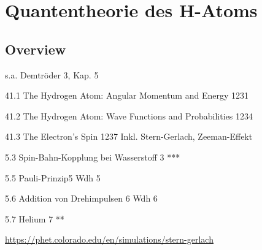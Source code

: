 \renewcommand{\lastmod}{10. September 2024}
\renewcommand{\chapterauthors}{Markus Lippitz}

\chapter{Quantentheorie des H-Atoms}






\section{Overview}

s.a. Demtröder 3, Kap. 5

41.1 The Hydrogen Atom: Angular Momentum and Energy 1231

41.2 The Hydrogen Atom: Wave Functions and Probabilities 1234

41.3 The Electron's Spin 1237
Inkl. Stern-Gerlach, Zeeman-Effekt

5.3 Spin-Bahn-Kopplung bei Wasserstoff 3	***	

5.5 Pauli-Prinzip5	Wdh	5 

5.6 Addition von Drehimpulsen 6	Wdh	6 

5.7 Helium 7	**	


\url{https://phet.colorado.edu/en/simulations/stern-gerlach}



\printbibliography[segment=\therefsegment,heading=subbibliography]
